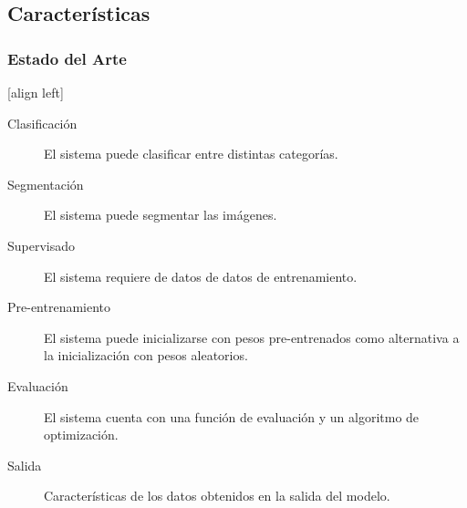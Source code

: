 \documentclass{beamer}
\begin{document}
\subsection{Características}
\begin{frame}
    \frametitle{Estado del Arte}
    [align left]
    \begin{description}
        \item[Clasificación]{El sistema puede clasificar entre distintas categorías.}
        \item[Segmentación]{El sistema puede segmentar las imágenes.}
        \item[Supervisado]{ El sistema requiere de datos de datos de entrenamiento.}
        \item[Pre-entrenamiento]{El sistema puede inicializarse con pesos pre-entrenados como alternativa a la inicialización con pesos aleatorios.}
        \item[Evaluación]{El sistema cuenta con una función de evaluación y un algoritmo de optimización.}
        \item[Salida]{Características de los datos obtenidos en la salida del modelo.}
    \end{description}
\end{frame}
\end{document}
